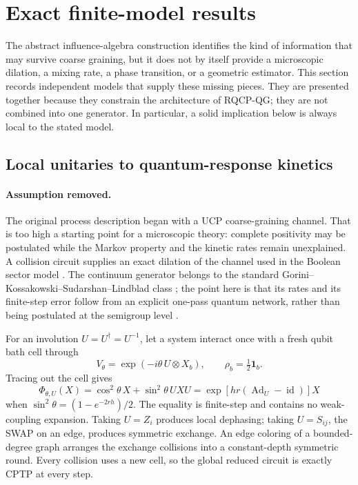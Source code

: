 \section{Exact finite-model results}
\label{sec:closed-loops}

The abstract influence-algebra construction identifies the kind of
information that may survive coarse graining, but it does not by itself
provide a microscopic dilation, a mixing rate, a phase transition, or a
geometric estimator.  This section records independent models that supply
these missing pieces.  They are presented together because they
constrain the architecture of RQCP-QG; they are not combined into one
generator.  In particular, a solid implication below is always local to the
stated model.

\subsection{Local unitaries to quantum-response kinetics}
\label{sec:loop-unitary-kinetics}

\paragraph{Assumption removed.}
The original process description began with a UCP coarse-graining channel.
That is too high a starting point for a microscopic theory: complete
positivity may be postulated while the Markov property and the kinetic rates
remain unexplained.  A collision circuit supplies an exact dilation of
the channel used in the Boolean sector model
\cite{XuResponseKinetics2026}.  The continuum generator belongs to the
standard Gorini--Kossakowski--Sudarshan--Lindblad class
\cite{Gorini1976,Lindblad1976}; the point here is that its rates and its
finite-step error follow from an explicit one-pass quantum network, rather
than being postulated at the semigroup level \cite{Chiribella2009}.

For an involution \(U=U^\dagger=U^{-1}\), let a system interact once with a
fresh qubit bath cell through
\begin{equation}
 V_\theta=\exp(-i\theta\,U\otimes X_b),
 \qquad
 \rho_b=\tfrac12\mathbf1_b .
 \label{eq:loop-collision-unitary}
\end{equation}
Tracing out the cell gives
\begin{equation}
 \Phi_{\theta,U}(X)
 =\cos^2\theta\,X+\sin^2\theta\,UXU
 =\exp\!\left[h r(\operatorname{Ad}_U-\operatorname{id})\right]X
 \label{eq:loop-one-collision}
\end{equation}
when \(\sin^2\theta=(1-e^{-2rh})/2\).  The equality is finite-step and
contains no weak-coupling expansion.  Taking \(U=Z_i\) produces local
dephasing; taking \(U=S_{ij}\), the SWAP on an edge, produces symmetric
exchange.  An edge coloring of a bounded-degree graph arranges the exchange
collisions into a constant-depth symmetric round.  Every collision uses a
new cell, so the global reduced circuit is exactly CPTP at every step.

